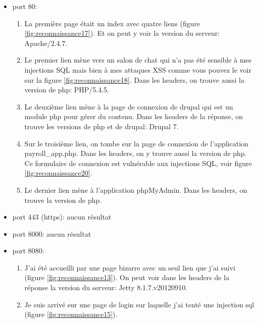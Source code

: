 \documentclass[a4paper]{article}
\begin{document}
\begin{itemize}
    \item port 80:
    \begin{example}
        \begin{enumerate}
            \item La première page était un index avec quatre liens (figure \ref{fig:reconnaissance17}). Et on peut y voir la version du serveur: Apache/2.4.7.
            \item Le premier lien mène vers un salon de chat qui n'a pas été sensible à mes injections SQL mais bien à mes attaques XSS comme vous pouvez le voir sur la figure \ref{fig:reconnaissance18}. Dans les headers, on trouve aussi la version de php: PHP/5.4.5.
            \item Le deuxième lien mène à la page de connexion de drupal qui est un module php pour gérer du contenu. Dans les headers de la réponse, on trouve les versions de php et de drupal: Drupal 7.
            \item Sur le troisième lien, on tombe sur la page de connexion de l'application payroll\_app.php. Dans les headers, on y trouve aussi la version de php. Ce formulaire de connexion est vulnérable aux injections SQL, voir figure \ref{fig:reconnaissance20}.
            \item Le dernier lien mène à l'application phpMyAdmin. Dans les headers, on trouve la version de php.
        \end{enumerate}
    \end{example}
    \item port 443 (https): aucun résultat
    \item port 8000: aucun résultat
    \item port 8080:
    \begin{example}
        \begin{enumerate}
            \item J'ai été accueilli par une page bizarre avec un seul lien que j'ai suivi (figure \ref{fig:reconnaissance13}). On peut voir dans les headers de la réponse la version du serveur: Jetty 8.1.7.v20120910.
            \item Je suis arrivé sur une page de login sur laquelle j'ai tenté une injection sql (figure \ref{fig:reconnaissance15}).
        \end{enumerate}
    \end{example}
\end{itemize}
\end{document}
